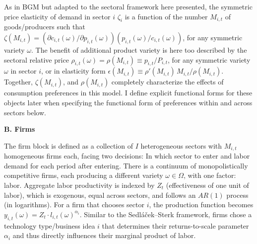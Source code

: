 \documentclass[a4paper,12pt]{article} %
\numberwithin{equation}{section} %
\numberwithin{figure}{section}
\numberwithin{table}{section}
\begin{document}
As in BGM but adapted to the sectoral framework here presented, the symmetric price elasticity of demand in sector $i$ $\zeta_i$  is a function 
of the number $M_{i,t}$ of goods/producers such that $\zeta (M_{i,t}) = (\partial c_{i,t}(\omega)/\partial p_{i,t}(\omega))(p_{i,t}(\omega)/c_{i,t}(\omega))$, 
for any symmetric variety $\omega$. The benefit of additional product variety is here too described by the sectoral relative price $\rho_{i,t}(\omega) =
\rho(M_{i,t}) \equiv p_{i,t}/P_{i,t}$, for any symmetric variety $\omega$ in sector $i$, or in elasticity form $\epsilon(M_{i,t}) \equiv \rho'(M_{i,t})\,M_{i,t}/\rho(M_{i,t})$. 
Together, $\zeta(M_{i,t})$, and $\rho (M_{i,t})$ completely 
characterize the effects of consumption preferences in this model. I define explicit functional forms for these objects later when specifying the 
functional form of preferences within and across sectors below.


\medskip
\medskip
\noindent\textbf{B. Firms}
\medskip

The firm block is defined as a collection of $I$ heterogeneous sectors with $M_{i,t}$ homogeneous firms each, 
facing two decisions: In which sector to enter and labor demand for each period after entering. There is a continuum of monopolistically competitive
firms, each producing a different variety $\omega \in \Omega$, with one factor: labor. 
Aggregate labor productivity is indexed by $Z_t$ (effectiveness of one unit of labor), which is 
exogenous, equal across sectors, and follows an $AR(1)$ process (in logarithms). For a firm that chooses sector $i$, the production function becomes
$y_{i,t}(\omega) = Z_t \cdot l_{i,t}(\omega)^{\alpha_i}$. Similar to the Sedláček–Sterk framework, firms chose a technology type/business idea $i$ 
that determines their returns-to-scale parameter $\alpha_i$ and thus directly influences their marginal product of labor.
\end{document}
